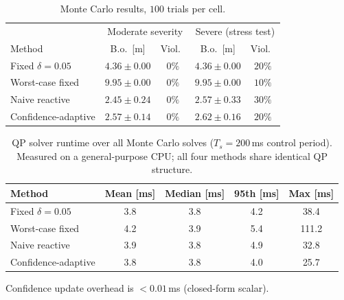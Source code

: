 

\begin{table}[t]
\centering
\caption{Monte Carlo results, $100$ trials per cell.}
\label{tab:montecarlo}
\small
\setlength{\tabcolsep}{3pt}
\begin{tabular}{lcccc}
\toprule
 & \multicolumn{2}{c}{Moderate severity} & \multicolumn{2}{c}{Severe (stress test)} \\
Method & B.o.\ [m] & Viol.\ & B.o.\ [m] & Viol.\ \\
\midrule
Fixed $\delta=0.05$ & $4.36\pm0.00$ & $0\%$ & $4.36\pm0.00$ & $20\%$ \\
Worst-case fixed & $9.95\pm0.00$ & $0\%$ & $9.95\pm0.00$ & $10\%$ \\
Naive reactive & $2.45\pm0.24$ & $0\%$ & $2.57\pm0.33$ & $30\%$ \\
Confidence-adaptive & $2.57\pm0.14$ & $0\%$ & $2.62\pm0.16$ & $20\%$ \\
\bottomrule
\end{tabular}
\end{table}


\begin{table}[t]
\centering
\caption{QP solver runtime over all Monte Carlo solves ($T_s=200$\,ms control period). Measured on a general-purpose CPU; all four methods share identical QP structure.}
\label{tab:runtime}
\small
\begin{tabular}{lcccc}
\toprule
Method & Mean [ms] & Median [ms] & 95th [ms] & Max [ms] \\
\midrule
Fixed $\delta=0.05$       & 3.8 & 3.8 & 4.2  & 38.4  \\
Worst-case fixed          & 4.2 & 3.9 & 5.4  & 111.2 \\
Naive reactive            & 3.9 & 3.8 & 4.9  & 32.8  \\
Confidence-adaptive       & 3.8 & 3.8 & 4.0  & 25.7  \\
\bottomrule
\end{tabular}

\vspace{2pt}
\footnotesize Confidence update overhead is $<0.01$\,ms (closed-form scalar).
\end{table}

